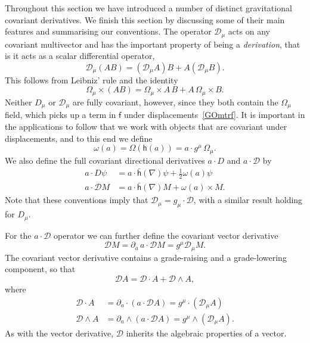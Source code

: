 \documentclass[a4paper]{article}
\numberwithin{equation}{section}
\newcommand{\dt}{\! \cdot \!}
\newcommand{\wdg}{\! \wedge \!}
\newcommand{\crs}{\! \times \!}
\newcommand{\half}{{\textstyle \frac{1}{2}}}
\newcommand{\eqv}{=}
\newcommand{\om}{\omega}
\newcommand{\Om}{\Omega}
\newcommand{\cld}{{\mathcal{D}}}
\newcommand{\da}{\partial_a}
\newcommand{\lif}{\mathsf{f}}
\newcommand{\lih}{\mathsf{h}}
\newcommand{\lbh}{\bar{\mathsf{h}}}
\newcommand{\ho}{\lbh}
\newcommand{\hu}{\lih}
\newcommand{\fu}{\lif}
\newcommand{\grad}{\nabla}
\begin{document}
Throughout this section we have introduced a number of distinct
gravitational covariant derivatives.  We finish this section by
discussing some of their main features and summarising our
conventions.  The operator $\cld_\mu$ acts on any covariant multivector
and has the important property of being a {\em derivation}, that is it
acts as a scalar differential operator,
%
\begin{equation}
\cld_\mu (AB) =  (\cld_\mu A)B + A (\cld_\mu B).
\end{equation}
%
This follows from Leibniz' rule and the identity
%
\begin{equation}
\Omega_\mu \crs (AB) =  \Omega_\mu \crs A \, B + A \, \Omega_\mu \crs B.
\end{equation}
% 
Neither $D_\mu$ or $\cld_\mu$ are fully covariant, however, since they
both contain the $\Om_\mu$ field, which picks up a term in $\fu$ under
displacements~\eqref{GOmtrf}.  It is important in the applications to
follow that we work with objects that are covariant under
displacements, and to this end we define
%
\begin{equation}
\om(a) \eqv \Om (\hu(a)) = a \dt g^\mu \, \Om_\mu.
\end{equation}
%
We also define the full covariant directional derivatives $a\dt D$ and
$a\dt\cld$ by
%
\begin{align}
a \dt D \psi &\eqv a \dt \ho(\grad) \psi + \half \om(a) \psi \\
a \dt \cld M &\eqv a \dt \ho(\grad) M + \om(a) \crs M.
\end{align}
%
Note that these conventions imply that $\cld_\mu = g_\mu \dt \cld$,
with a similar result holding for $D_\mu$.


For the $a\dt\cld$ operator we can further define the covariant vector
derivative 
%
\begin{equation}
\cld M \eqv  \da \, a \dt \cld M = g^\mu \cld_\mu M.
\end{equation}
%
The covariant vector derivative contains a grade-raising and a
grade-lowering component, so that 
%
\begin{equation}
\cld A = \cld \dt A + \cld \wdg A,
\end{equation}
%
where
%
\begin{align}
\cld \dt A &\eqv \da \dt (a \dt \cld A) = g^\mu \dt (\cld_\mu A) \\
\cld \wdg A &\eqv \da \wdg (a \dt \cld A) = g^\mu \wdg (\cld_\mu A).
\end{align}
%
As with the vector derivative, $\cld$ inherits the algebraic
properties of a vector.  
\end{document}
